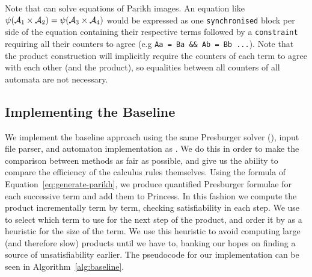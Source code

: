 \documentclass[acmsmall,review,anonymous]{acmart}\settopmatter{printfolios=true,printccs=false,printacmref=true}
\theoremstyle{definition}
\begin{document}
Note that \Catra{} can solve equations of Parikh images. An equation like
$\operatorname{\psi}(\mathcal{A}_1 \times \mathcal{A}_2) = \operatorname{\psi}(\mathcal{A}_3 \times
\mathcal{A}_4)$ would be expressed as one \lstinline{synchronised} block per side of
the equation containing their respective terms followed by a
\lstinline{constraint} requiring all their counters to agree (e.g
\lstinline|Aa = Ba && Ab = Bb ...|). Note that the product construction will implicitly require the counters of each term to agree with each other (and the product), so equalities between all counters of all automata are not necessary.

\subsection{Implementing the Baseline}\label{sec:implementing-baseline}

We implement the baseline approach using the same Presburger solver
(\Princess{}), input file parser, and automaton implementation as \Catra{}. We
do this in order to make the comparison between methods as fair as possible, and
give us the ability to compare the efficiency of the calculus rules themselves.
Using the formula of Equation~\ref{eq:generate-parikh}, we produce quantified
Presburger formulae for each successive term and add them to Princess. In this
fashion we compute the product incrementally term by term, checking
satisfiability in each step. We use  to select which
term to use for the next step of the product, and order it by  as a heuristic for the size of the term. We use this heuristic
to avoid computing large (and therefore slow) products until we have to, banking
our hopes on finding a source of unsatisfiability earlier. The pseudocode for
our implementation can be seen in Algorithm~\ref{alg:baseline}.
\end{document}
